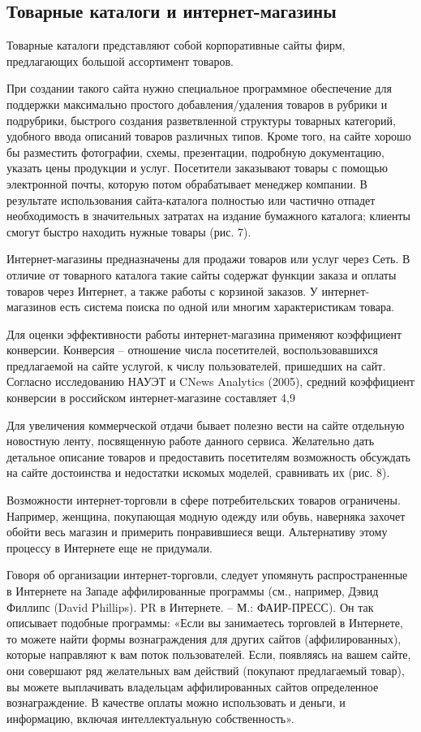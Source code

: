 \documentclass[a4paper,english,russian]{G2-105}
\begin{document}
\subsection{Товарные каталоги и интернет-магазины}
\par Товарные каталоги представляют собой корпоративные сайты фирм, предлагающих большой ассортимент товаров.
\par При создании такого сайта нужно специальное программное обеспечение для поддержки максимально простого добавления/удаления товаров в рубрики и подрубрики, быстрого создания разветвленной структуры товарных категорий, удобного ввода описаний товаров различных типов. Кроме того, на сайте хорошо бы разместить фотографии, схемы, презентации, подробную документацию, указать цены продукции и услуг. Посетители заказывают товары с помощью электронной почты, которую потом обрабатывает менеджер компании. В результате использования сайта-каталога полностью или частично отпадет необходимость в значительных затратах на издание бумажного каталога; клиенты смогут быстро находить нужные товары (рис. 7).
\par Интернет-магазины предназначены для продажи товаров или услуг через Сеть. В отличие от товарного каталога такие сайты содержат функции заказа и оплаты товаров через Интернет, а также работы с корзиной заказов. У интернет-магазинов есть система поиска по одной или многим характеристикам товара.
\par Для оценки эффективности работы интернет-магазина применяют коэффициент конверсии. Конверсия – отношение числа посетителей, воспользовавшихся предлагаемой на сайте услугой, к числу пользователей, пришедших на сайт. Согласно исследованию НАУЭТ и CNews Analytics  (2005), средний коэффициент конверсии в российском интернет-магазине составляет 4,9 %
\par Для увеличения коммерческой отдачи бывает полезно вести на сайте отдельную новостную ленту, посвященную работе данного сервиса. Желательно дать детальное описание товаров и предоставить посетителям возможность обсуждать на сайте достоинства и недостатки искомых моделей, сравнивать их (рис. 8).
\par Возможности интернет-торговли в сфере потребительских товаров ограничены. Например, женщина, покупающая модную одежду или обувь, наверняка захочет обойти весь магазин и примерить понравившиеся вещи. Альтернативу этому процессу в Интернете еще не придумали.
\par Говоря об организации интернет-торговли, следует упомянуть распространенные в Интернете на Западе аффилированные программы (см., например, Дэвид Филлипс (David Phillips). PR в Интернете. – М.: ФАИР-ПРЕСС). Он так описывает подобные программы: «Если вы занимаетесь торговлей в Интернете, то можете найти формы вознаграждения для других сайтов (аффилированных), которые направляют к вам поток пользователей. Если, появляясь на вашем сайте, они совершают ряд желательных вам действий (покупают предлагаемый товар), вы можете выплачивать владельцам аффилированных сайтов определенное вознаграждение. В качестве оплаты можно использовать и деньги, и информацию, включая интеллектуальную собственность».
\end{document}
